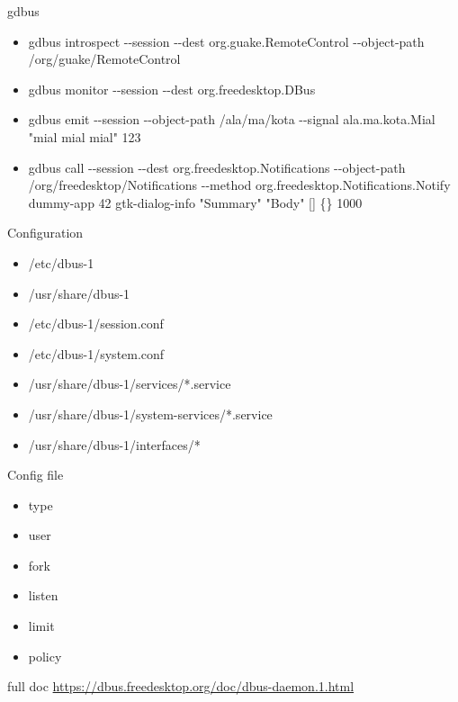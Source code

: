 \documentclass{beamer}
\begin{document}
\begin{frame}{gdbus}
  \begin{itemize}
    \item gdbus introspect -{}-session -{}-dest org.guake.RemoteControl -{}-object-path /org/guake/RemoteControl
    \item gdbus monitor -{}-session -{}-dest org.freedesktop.DBus
    \item gdbus emit -{}-session -{}-object-path /ala/ma/kota -{}-signal ala.ma.kota.Mial "mial mial mial" 123
    \item gdbus call -{}-session -{}-dest org.freedesktop.Notifications -{}-object-path /org/freedesktop/Notifications -{}-method org.freedesktop.Notifications.Notify dummy-app 42 gtk-dialog-info  "Summary" "Body" [] \{\} 1000
  \end{itemize}
\end{frame}

\begin{frame}{Configuration}
  \begin{itemize}
    \item /etc/dbus-1
    \item /usr/share/dbus-1
    \item /etc/dbus-1/session.conf
    \item /etc/dbus-1/system.conf
    \item /usr/share/dbus-1/services/*.service
    \item /usr/share/dbus-1/system-services/*.service
    \item /usr/share/dbus-1/interfaces/*
  \end{itemize}
\end{frame}

\begin{frame}{Config file}
  \begin{itemize}
    \item type
    \item user
    \item fork
    \item listen
    \item limit
    \item policy
  \end{itemize}
  \hfill
  \begin{exampleblock}{full doc}
    \url{https://dbus.freedesktop.org/doc/dbus-daemon.1.html}
  \end{exampleblock}
\end{frame}
\end{document}
